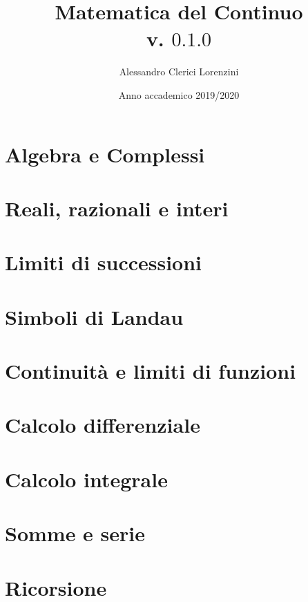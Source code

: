 \documentclass[a4paper,twoside]{report}
\begin{document}
\title{Matematica del Continuo\\
	\normalsize v. $0.1.0$ }
\author{Alessandro Clerici Lorenzini}
\date{Anno accademico 2019/2020}
\maketitle
\tableofcontents


\chapter{Algebra e Complessi}




\chapter{Reali, razionali e interi}



\chapter{Limiti di successioni}



\chapter{Simboli di Landau}




\chapter{Continuità e limiti di funzioni}






\chapter{Calcolo differenziale}





\chapter{Calcolo integrale}




\chapter{Somme e serie}




\chapter{Ricorsione}

\end{document}
